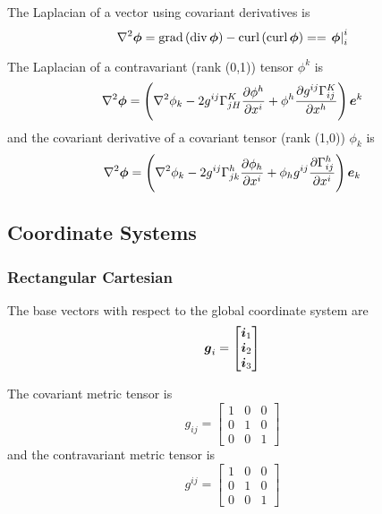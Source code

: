 The Laplacian of a vector using covariant derivatives is
\begin{equation}
  \laplacian{}{\vectr{\phi}}=\gradop\pbrac{\divop\vectr{\phi}}-\curlop \pbrac{\curlop\vectr{\phi}}==\mixedderiv{\vectr{\phi}}{i}{i}
\end{equation}

The Laplacian of a contravariant (rank (0,1)) tensor $\phi^{k}$ is
\begin{equation}
  \laplacian{}{\vectr{\phi}}=\pbrac{\laplacian{}{\phi_{k}}-2g^{ij}\christoffel{K}{j}{H}\delby{\phi^{h}}{x^{i}}+\phi^{h}\delby{g^{ij}\christoffel{K}{i}{j}}{x^{h}}}\vectr{e}^{k}
\end{equation}
and the covariant derivative of a covariant tensor  (rank (1,0)) $\phi_{k}$ is
\begin{equation}
  \laplacian{}{\vectr{\phi}}=\pbrac{\laplacian{}{\phi_{k}}-2g^{ij}\christoffel{h}{j}{k}\delby{\phi_{h}}{x^{i}}+\phi_{h}g^{ij}\delby{\christoffel{h}{i}{j}}{x^{i}}}\vectr{e}_{k}
\end{equation}

\subsection{Coordinate Systems}
\label{sec:coordinate systems}

\subsubsection{Rectangular Cartesian}

The base vectors with respect to the global coordinate system are
\begin{equation}
  \boldsymbol{g}_{i}=\begin{bmatrix} 
    \boldsymbol{i}_{1} \\ 
    \boldsymbol{i}_{2} \\
    \boldsymbol{i}_{3} 
  \end{bmatrix}
\end{equation}

The covariant metric tensor is
\begin{equation}
  g_{ij}=\begin{bmatrix}
    1 & 0 & 0 \\
    0 & 1 & 0 \\
    0 & 0 & 1
  \end{bmatrix}
\end{equation}
and the contravariant metric tensor is
\begin{equation}
  g^{ij}=\begin{bmatrix}
    1 & 0 & 0 \\
    0 & 1 & 0 \\
    0 & 0 & 1
  \end{bmatrix}
\end{equation}

